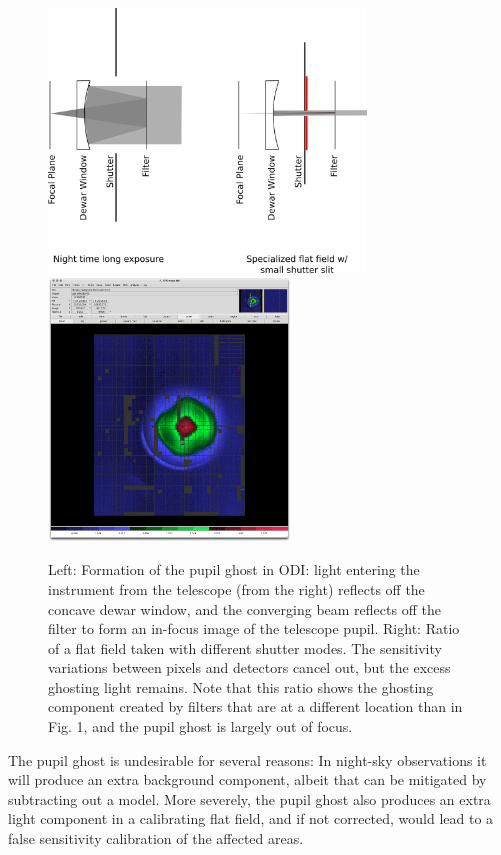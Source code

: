 \documentclass[]{spieman}
\begin{document}
\begin{figure}
\centering
\includegraphics[height=7cm]{images/odishutterpupilghostsupression.png}
\hspace{0.75cm} \includegraphics[height=7cm]{images/odi_layeronepg.png}
	
\caption{ \label{fig_pupilghost}Left: Formation of the pupil ghost in ODI: 
    light entering the instrument from the telescope (from the right) reflects off
    the concave dewar window, and the converging beam reflects off the filter to form
    an in-focus image of the telescope pupil. Right: Ratio of a flat field taken
    with different shutter modes. The sensitivity variations between pixels and
    detectors cancel out, but the excess ghosting light remains. Note that this
    ratio shows the ghosting component created by filters that are at a different
    location than in Fig. 1, and the pupil ghost is largely out of focus.}
\end{figure}

The pupil ghost is undesirable for several reasons: In night-sky observations it
will produce an extra background component, albeit that can be mitigated by
subtracting out a model. More severely, the pupil ghost also produces an extra
light component in a calibrating flat field, and if not corrected, would lead to
a false sensitivity calibration of the affected areas.
\end{document}
